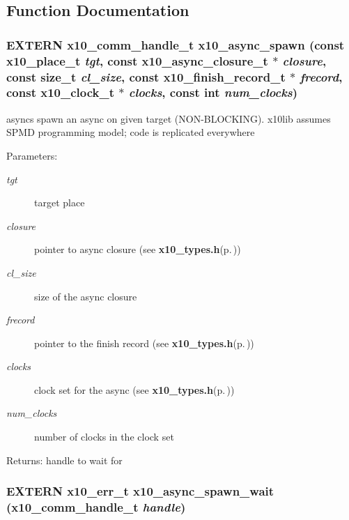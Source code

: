\subsection{Function Documentation}
\subsubsection{\setlength{\rightskip}{0pt plus 5cm}EXTERN {\bf x10\_\-comm\_\-handle\_\-t} x10\_\-async\_\-spawn (const {\bf x10\_\-place\_\-t} {\em tgt}, const {\bf x10\_\-async\_\-closure\_\-t} $\ast$ {\em closure}, const size\_\-t {\em cl\_\-size}, const {\bf x10\_\-finish\_\-record\_\-t} $\ast$ {\em frecord}, const {\bf x10\_\-clock\_\-t} $\ast$ {\em clocks}, const int {\em num\_\-clocks})}\label{x10_8h_a4}


asyncs spawn an async on given target (NON-BLOCKING). x10lib assumes SPMD programming model; code is replicated everywhere 

\begin{Desc}
\item[Parameters:]
\begin{description}
\item[{\em tgt}]target place \item[{\em closure}]pointer to async closure (see {\bf x10\_\-types.h}{\rm (p.\,\pageref{x10__types_8h})}) \item[{\em cl\_\-size}]size of the async closure \item[{\em frecord}]pointer to the finish record (see {\bf x10\_\-types.h}{\rm (p.\,\pageref{x10__types_8h})}) \item[{\em clocks}]clock set for the async (see {\bf x10\_\-types.h}{\rm (p.\,\pageref{x10__types_8h})}) \item[{\em num\_\-clocks}]number of clocks in the clock set\end{description}
\end{Desc}
\begin{Desc}
\item[Returns:]handle to wait for \end{Desc}
\subsubsection{\setlength{\rightskip}{0pt plus 5cm}EXTERN {\bf x10\_\-err\_\-t} x10\_\-async\_\-spawn\_\-wait ({\bf x10\_\-comm\_\-handle\_\-t} {\em handle})}\label{x10_8h_a5}


